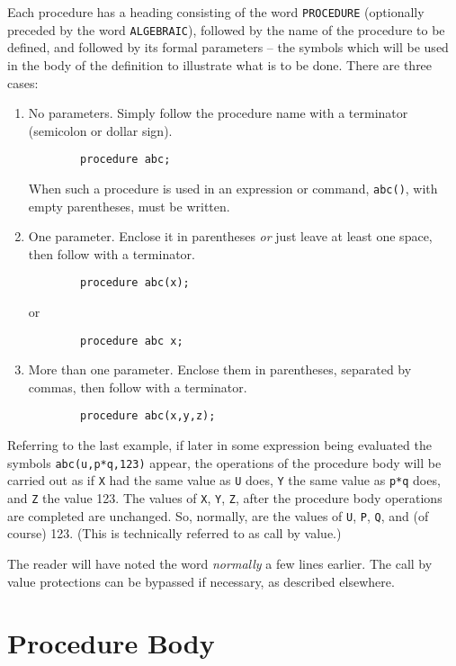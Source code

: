 Each procedure has a heading consisting of the word {\tt PROCEDURE}
(optionally preceded by the word {\tt ALGEBRAIC}), followed by the name of
the procedure to be defined, and followed by its formal parameters -- the
symbols which will be used in the body of the definition to illustrate
what is to be done.  There are three cases:
\begin{enumerate}
\item No parameters. Simply follow the procedure name with a terminator
(semicolon or dollar sign).
\begin{verbatim}
        procedure abc;
\end{verbatim}

When such a procedure is used in an expression or command, {\tt abc()}, with
empty parentheses, must be written.

\item One parameter.  Enclose it in parentheses {\em or} just leave at
least one space, then follow with a terminator.
\begin{verbatim}
        procedure abc(x);
\end{verbatim}
or
\begin{verbatim}
        procedure abc x;
\end{verbatim}

\item More than one parameter. Enclose them in parentheses, separated by
commas, then follow with a terminator.
\begin{verbatim}
        procedure abc(x,y,z);
\end{verbatim}
\end{enumerate}
Referring to the last example, if later in some expression being evaluated
the symbols {\tt abc(u,p*q,123)} appear, the operations of the procedure
body will be carried out as if {\tt X} had the same value as {\tt U} does,
{\tt Y} the same value as {\tt p*q} does, and {\tt Z} the value 123.  The
values of {\tt X}, {\tt Y}, {\tt Z}, after the procedure body operations
are completed are unchanged.  So, normally, are the values of {\tt U},
{\tt P}, {\tt Q}, and (of course) 123. (This is technically referred to as
call by value.) 

The reader will have noted the word {\em normally} a few lines earlier. The
call by value protections can be bypassed if necessary, as described
elsewhere.

\section{Procedure Body} 

